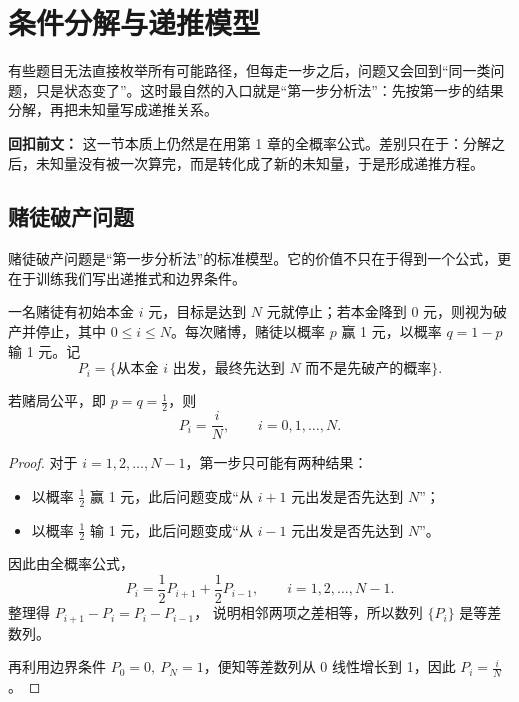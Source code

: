﻿\documentclass[lang=cn,11pt]{elegantbook}
\begin{document}
\section{条件分解与递推模型}

有些题目无法直接枚举所有可能路径，但每走一步之后，问题又会回到“同一类问题，只是状态变了”。这时最自然的入口就是“第一步分析法”：先按第一步的结果分解，再把未知量写成递推关系。

\begin{note}
\textbf{回扣前文：} 这一节本质上仍然是在用第 1 章的全概率公式。差别只在于：分解之后，未知量没有被一次算完，而是转化成了新的未知量，于是形成递推方程。
\end{note}

\subsection{赌徒破产问题}

赌徒破产问题是“第一步分析法”的标准模型。它的价值不只在于得到一个公式，更在于训练我们写出递推式和边界条件。

\begin{definition}[赌徒破产模型]\label{def:gambler-ruin-model}
一名赌徒有初始本金 \(i\) 元，目标是达到 \(N\) 元就停止；若本金降到 0 元，则视为破产并停止，其中 \(0\le i\le N\)。每次赌博，赌徒以概率 \(p\) 赢 1 元，以概率 \(q=1-p\) 输 1 元。记
\[
P_i=\{\text{从本金 }i\text{ 出发，最终先达到 }N\text{ 而不是先破产的概率}\}.
\]
\end{definition}

\begin{theorem}[公平赌局中的达标概率]\label{thm:gambler-fair}
若赌局公平，即 \(p=q=\frac12\)，则
\[
P_i=\frac{i}{N},\qquad i=0,1,\dots,N.
\]
\end{theorem}

\begin{proof}
对于 \(i=1,2,\dots,N-1\)，第一步只可能有两种结果：
\begin{itemize}
    \item 以概率 \(\frac12\) 赢 1 元，此后问题变成“从 \(i+1\) 元出发是否先达到 \(N\)”；
    \item 以概率 \(\frac12\) 输 1 元，此后问题变成“从 \(i-1\) 元出发是否先达到 \(N\)”。
\end{itemize}
因此由全概率公式，
\[
P_i=\frac12P_{i+1}+\frac12P_{i-1},\qquad i=1,2,\dots,N-1.
\]
整理得 \(P_{i+1}-P_i=P_i-P_{i-1}\)，
说明相邻两项之差相等，所以数列 \(\{P_i\}\) 是等差数列。

再利用边界条件 \(P_0=0,\ P_N=1\)，便知等差数列从 0 线性增长到 1，因此 \(P_i=\frac{i}{N}\)。
\end{proof}
\end{document}
